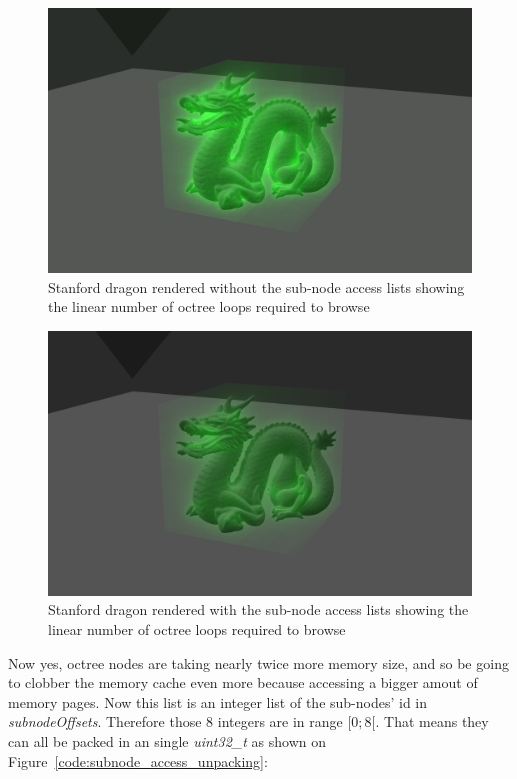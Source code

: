 \documentclass[10pt,twocolumn,a4paper]{article}
\begin{document}
\begin{figure}[h]
    \centering
    \includegraphics[width=0.8\columnwidth]{stats_octree_loops.png}
    \caption{
        Stanford dragon rendered without the sub-node access lists showing
        the linear number of octree loops required to browse
    }
    \label{fig:stanford_dragon_without_access_list}
\end{figure}

\begin{figure}[h]
    \centering
    \includegraphics[width=0.8\columnwidth]{stats_octree_loops_optimized.png}
    \caption{
        Stanford dragon rendered with the sub-node access lists showing
        the linear number of octree loops required to browse
    }
    \label{fig:stanford_dragon_with_access_list}
\end{figure}

Now yes, octree nodes are taking nearly twice more memory size, and so be going
to clobber the memory cache even more because accessing a bigger amout of
memory pages. Now this list is an integer list of the sub-nodes' id in
\textit{subnodeOffsets}. Therefore those 8 integers are in range $[0;8[$. That
means they can all be packed in an single \textit{uint32\_t} as shown on
Figure~\ref{code:subnode_access_unpacking}:
\end{document}
